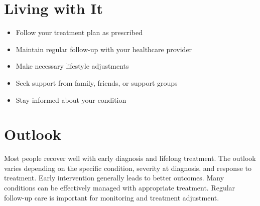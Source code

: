 \section{Living with It}
\begin{itemize}[noitemsep]
  \item Follow your treatment plan as prescribed
  \item Maintain regular follow-up with your healthcare provider
  \item Make necessary lifestyle adjustments
  \item Seek support from family, friends, or support groups
  \item Stay informed about your condition
\end{itemize}
\section{Outlook}
Most people recover well with early diagnosis and lifelong treatment. The outlook varies depending on the specific condition, severity at diagnosis, and response to treatment. Early intervention generally leads to better outcomes. Many conditions can be effectively managed with appropriate treatment. Regular follow-up care is important for monitoring and treatment adjustment.

